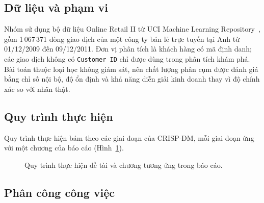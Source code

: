 \documentclass[../report.tex]{subfiles}
\begin{document}
\subsection{Dữ liệu và phạm vi}

Nhóm sử dụng bộ dữ liệu Online Retail II từ UCI Machine Learning Repository~\cite{chen2019dataset}, gồm 1\,067\,371 dòng giao dịch của một công ty bán lẻ trực tuyến tại Anh từ 01/12/2009 đến 09/12/2011. Đơn vị phân tích là khách hàng có mã định danh; các giao dịch không có \texttt{Customer ID} chỉ được dùng trong phân tích khám phá. Bài toán thuộc loại học không giám sát, nên chất lượng phân cụm được đánh giá bằng chỉ số nội bộ, độ ổn định và khả năng diễn giải kinh doanh thay vì độ chính xác so với nhãn thật.

\subsection{Quy trình thực hiện}

Quy trình thực hiện bám theo các giai đoạn của CRISP-DM, mỗi giai đoạn ứng với một chương của báo cáo (Hình~\ref{fig:pipeline}).

\begin{figure}[H]
\centering
{}
\caption{Quy trình thực hiện đề tài và chương tương ứng trong báo cáo.}
\label{fig:pipeline}
\end{figure}

\subsection{Phân công công việc}
\end{document}
